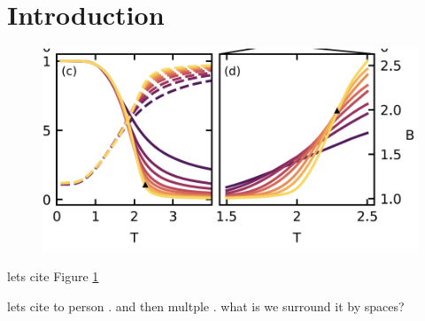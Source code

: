 \begin{Shaded}
\begin{Highlighting}[]
\OperatorTok{\%\%}
\end{Highlighting}
\end{Shaded}

\hypertarget{introduction}{%
\section{Introduction}\label{introduction}}

\begin{figure}
\hypertarget{fig:binder}{%
\centering
\includegraphics{figure_code/fk_chapter/binder.png}
\caption{}\label{fig:binder}
}
\end{figure}

lets cite Figure \ref{fig:binder}

lets cite to person \textcite{trebstKitaevMaterials2022}. and then
multple
\autocite{banerjeeProximateKitaevQuantum2016,trebstKitaevMaterials2022}.
what is we surround it by spaces? \textcite{trebstKitaevMaterials2022}
